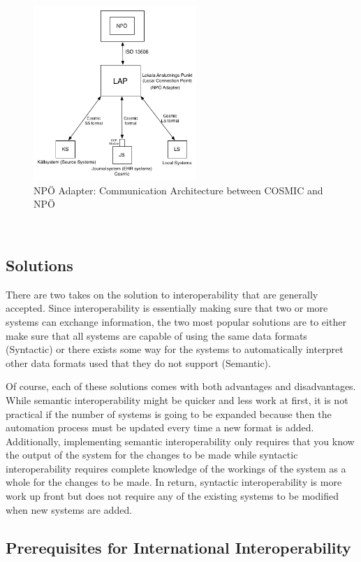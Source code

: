 \documentclass[14pt]{article}
\begin{document}
\begin{figure}[h!]
  \caption{NPÖ Adapter: Communication Architecture between COSMIC and NPÖ}
  \centering
    \includegraphics[width=0.55\textwidth]{Images/npoAdapt}
\end{figure}\

\subsection{Solutions}
There are two takes on the solution to interoperability that are generally accepted.  Since interoperability is essentially making sure that two or more systems can exchange information, the two most popular solutions are to either make sure that all systems are capable of using the same data formats (Syntactic) or there exists some way for the systems to automatically interpret other data formats used that they do not support (Semantic).

Of course, each of these solutions comes with both advantages and disadvantages.  While semantic interoperability might be quicker and less work at first, it is not practical if the number of systems is going to be expanded because then the automation process must be updated every time a new format is added.  Additionally, implementing semantic interoperability only requires that you know the output of the system for the changes to be made while syntactic interoperability requires complete knowledge of the workings of the system as a whole for the changes to be made.  In return, syntactic interoperability is more work up front but does not require any of the existing systems to be modified when new systems are added.

\subsection{Prerequisites for International Interoperability}
\end{document}
